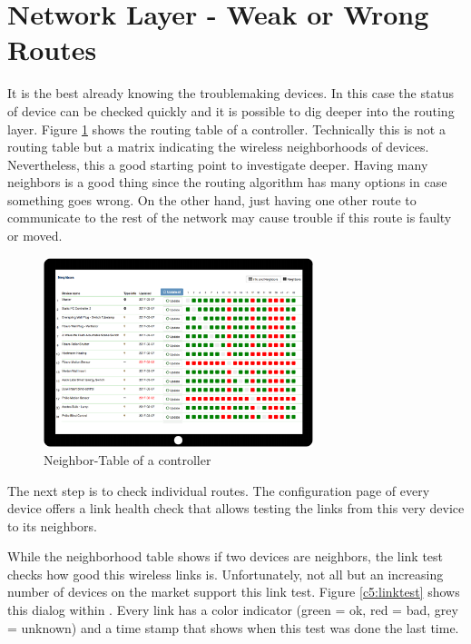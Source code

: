 \section{Network Layer - Weak or Wrong Routes}

It is the best already knowing the troublemaking devices. In this case the status of device 
can be checked quickly and it is possible to dig deeper into the routing layer. 
Figure \ref{c5:neighbortable} shows the routing table of a controller. Technically 
this is not a routing table but a matrix indicating the wireless neighborhoods of devices.
Nevertheless, this a good starting point to investigate deeper. Having many neighbors 
is a good thing since the routing algorithm has many options in case something goes 
wrong. On the other hand, just having one other route to communicate to the rest of 
the network may cause trouble if this route is faulty or moved.

\begin{figure}
\begin{center}
\includegraphics[width=0.7\textwidth]{pngs/cap8/c3neighbortable.pdf}
\caption{Neighbor-Table of a controller}
\label{c5:neighbortable}
\end{center}
\end{figure}

The next step is to check individual routes. The configuration page of every device offers 
a link health check that allows testing the links from this very device to its neighbors.

While the neighborhood table shows if two devices are neighbors, the link test checks how
 good this wireless links is. Unfortunately, not all but an increasing number of devices 
 on the market support this link test. Figure \ref{c5:linktest} shows this dialog 
 within \zweui. Every link has a color indicator (green = ok, 
 red = bad, grey = unknown) and a time stamp that shows when this test was done the 
 last time.


